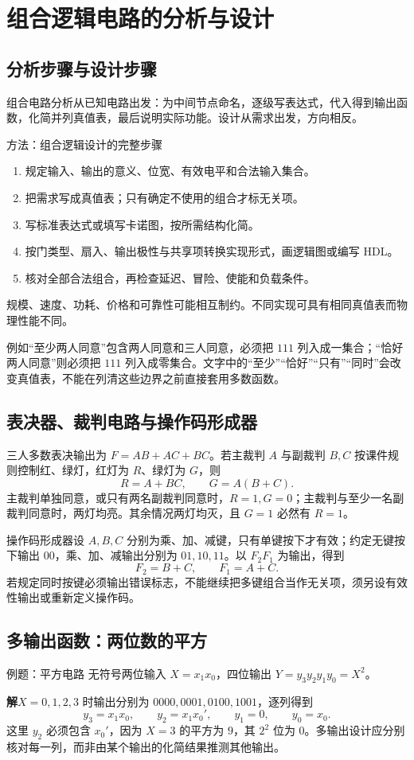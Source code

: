 \documentclass[UTF8,fontset=none,zihao=-4,a4paper]{ctexart}
\newcommand{\chapterpage}[1]{\clearpage\section{#1}}
\newcommand{\sol}{\par\noindent\textbf{解}\quad}
\begin{document}
\chapterpage{组合逻辑电路的分析与设计}
\subsection{分析步骤与设计步骤}
组合电路分析从已知电路出发：为中间节点命名，逐级写表达式，代入得到输出函数，化简并列真值表，最后说明实际功能。设计从需求出发，方向相反。
\begin{infobox}{方法：组合逻辑设计的完整步骤}
\begin{enumerate}
\item 规定输入、输出的意义、位宽、有效电平和合法输入集合。
\item 把需求写成真值表；只有确定不使用的组合才标无关项。
\item 写标准表达式或填写卡诺图，按所需结构化简。
\item 按门类型、扇入、输出极性与共享项转换实现形式，画逻辑图或编写 HDL。
\item 核对全部合法组合，再检查延迟、冒险、使能和负载条件。
\end{enumerate}
\end{infobox}
规模、速度、功耗、价格和可靠性可能相互制约。不同实现可具有相同真值表而物理性能不同。

例如“至少两人同意”包含两人同意和三人同意，必须把 $111$ 列入成一集合；“恰好两人同意”则必须把 $111$ 列入成零集合。文字中的“至少”“恰好”“只有”“同时”会改变真值表，不能在列清这些边界之前直接套用多数函数。

\subsection{表决器、裁判电路与操作码形成器}
三人多数表决输出为 $F=AB+AC+BC$。若主裁判 $A$ 与副裁判 $B,C$ 按课件规则控制红、绿灯，红灯为 $R$、绿灯为 $G$，则
\[
R=A+BC,\qquad G=A(B+C).
\]
主裁判单独同意，或只有两名副裁判同意时，$R=1,G=0$；主裁判与至少一名副裁判同意时，两灯均亮。其余情况两灯均灭，且 $G=1$ 必然有 $R=1$。

操作码形成器设 $A,B,C$ 分别为乘、加、减键，只有单键按下才有效；约定无键按下输出 $00$，乘、加、减输出分别为 $01,10,11$。以 $F_2F_1$ 为输出，得到
\[
F_2=B+C,\qquad F_1=A+C.
\]
若规定同时按键必须输出错误标志，不能继续把多键组合当作无关项，须另设有效性输出或重新定义操作码。

\subsection{多输出函数：两位数的平方}
\begin{infobox}{例题：平方电路}
无符号两位输入 $X=x_1x_0$，四位输出 $Y=y_3y_2y_1y_0=X^2$。
\end{infobox}
\sol $X=0,1,2,3$ 时输出分别为 $0000,0001,0100,1001$，逐列得到
\[
y_3=x_1x_0,\qquad y_2=x_1x_0',\qquad y_1=0,\qquad y_0=x_0.
\]
这里 $y_2$ 必须包含 $x_0'$，因为 $X=3$ 的平方为 $9$，其 $2^2$ 位为 $0$。多输出设计应分别核对每一列，而非由某个输出的化简结果推测其他输出。
\end{document}
